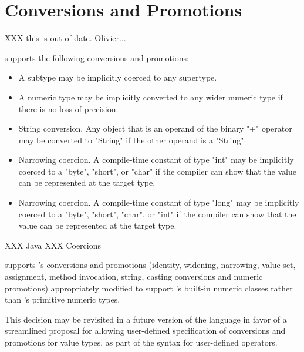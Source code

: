\section{Conversions and Promotions}\label{XtenConversions}\label{XtenPromotions}

XXX this is out of date.  Olivier...

\XtenCurrVer{} supports the following conversions and
promotions:
\begin{itemize}
\item A subtype may be implicitly coerced to any supertype.
\item A numeric type may be implicitly converted to any wider
numeric type if there is no loss of precision.
\item String conversion.  Any object that is an operand of the binary
\xcd"+" operator may
be converted to \xcd"String" if the other operand is a \xcd"String".
\item Narrowing coercion.  A compile-time constant of type \xcd"int" may be
implicitly coerced to a \xcd"byte", \xcd"short", or \xcd"char"
if the compiler can show that the value can be represented at
the target type.
\item Narrowing coercion.  A compile-time constant of type
\xcd"long" may be
implicitly coerced to a \xcd"byte", \xcd"short", \xcd"char",
or \xcd"int"
if the compiler can show that the value can be represented at
the target type.
\end{itemize}

XXX Java
XXX Coercions

{}\XtenCurrVer{} supports \java's conversions and promotions
(identity, widening, narrowing, value set, assignment, method
invocation, string, casting conversions and numeric promotions)
appropriately modified to support \Xten's built-in numeric classes
rather than \java's primitive numeric types.

This decision may be revisited in a future version of the language in
favor of a streamlined proposal for allowing user-defined
specification of conversions and promotions for value types, as part
of the syntax for user-defined operators.


